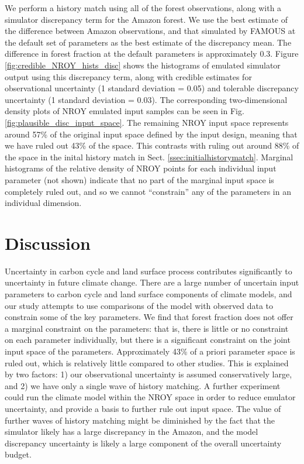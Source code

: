 \documentclass[esd, article]{copernicus} %
\begin{document}
We perform a history match using all of the forest observations, along with a simulator discrepancy term for the Amazon forest. We use the best estimate of the difference between Amazon observations, and that simulated by FAMOUS at the default set of parameters as the best estimate of the discrepancy mean. The difference in forest fraction at the default parameters is approximately 0.3. Figure \ref{fig:credible_NROY_hists_disc} shows the histograms of emulated simulator output using this discrepancy term, along with credible estimates for observational uncertainty (1 standard deviation = 0.05) and tolerable discrepancy uncertainty (1 standard deviation = 0.03). The corresponding two-dimensional density plots of NROY emulated input samples can be seen in Fig.  \ref{fig:plausible_disc_input_space}. The remaining NROY input space represents around 57\% of the original input space defined by the input design, meaning that we have ruled out 43\% of the space. This contrasts with ruling out around 88\% of the space in the inital history match in Sect. \ref{ssec:initialhistorymatch}. Marginal histograms of the relative density of NROY points for each individual input parameter (not shown) indicate that no part of the marginal input space is completely ruled out, and so we cannot ``constrain'' any of the parameters in an individual dimension.

 


\section{Discussion}\label{sec:discussion}
Uncertainty in carbon cycle and land surface process contributes significantly to uncertainty in future climate change. There are a large number of uncertain input parameters to carbon cycle and land surface components of climate models, and our study attempts to use comparisons of the model with observed data to constrain some of the key parameters. We find that forest fraction does not offer a marginal constraint on the parameters: that is, there is little or no constraint on each parameter individually, but there is a significant constraint on the joint input space of the parameters. Approximately 43\% of a priori parameter space is ruled out, which is relatively little compared to other studies. This is explained by two factors: 1) our observational uncertainty is assumed conservatively large, and 2) we have only a single wave of history matching. A further experiment could run the climate model within the NROY space in order to reduce emulator uncertainty, and provide a basis to further rule out input space. The value of further waves of history matching might be diminished by the fact that the simulator likely has a large discrepancy in the Amazon, and the model discrepancy uncertainty is likely a large component of the overall uncertainty budget.
\end{document}
